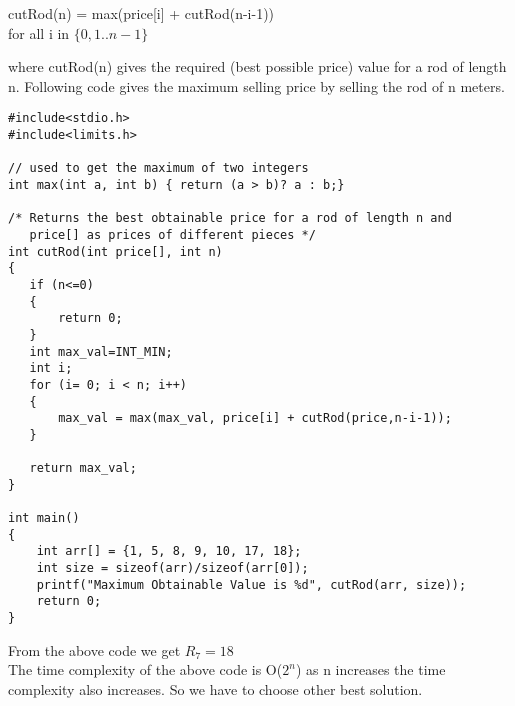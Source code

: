 \documentclass[journal,12pt,twocolumn]{IEEEtran}
\begin{document}
\begin{center}
    cutRod(n) = max(price[i] + cutRod(n-i-1)) \\
    for all i in $\{0, 1 .. n-1\}$
\end{center}
where cutRod(n) gives the required (best possible price) value for a rod of length n. 
\newline
\newline
Following code gives the maximum selling price by selling the rod of n meters.
\begin{lstlisting}
#include<stdio.h>
#include<limits.h>
 
// used to get the maximum of two integers
int max(int a, int b) { return (a > b)? a : b;}
 
/* Returns the best obtainable price for a rod of length n and
   price[] as prices of different pieces */
int cutRod(int price[], int n)
{
   if (n<=0)
   {
	   return 0;
   }
   int max_val=INT_MIN;
   int i;
   for (i= 0; i < n; i++)
   {
	   max_val = max(max_val, price[i] + cutRod(price,n-i-1));
   }
 
   return max_val;
}
 
int main()
{
    int arr[] = {1, 5, 8, 9, 10, 17, 18};
    int size = sizeof(arr)/sizeof(arr[0]);
    printf("Maximum Obtainable Value is %d", cutRod(arr, size));
    return 0;
}

\end{lstlisting}

From the above code we get $R_{7}=18$\\
\newline
The time complexity of the above code is O($2^n$) as n increases the time complexity also increases.
So we have to choose other best solution.\\
\end{document}
